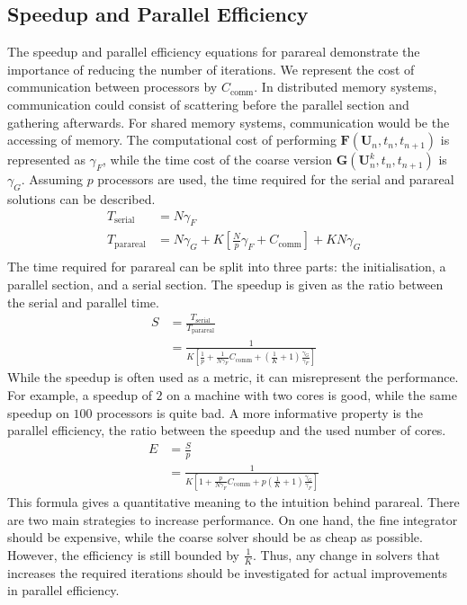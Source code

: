 \subsection{Speedup and Parallel Efficiency}
The speedup and parallel efficiency equations for parareal demonstrate the importance of reducing the number of iterations. We represent the cost of communication between processors by $C_\mathrm{comm}$. In distributed memory systems, communication could consist of scattering before the parallel section and gathering afterwards. For shared memory systems, communication would be the accessing of memory.
The computational cost of performing $\textbf{F}(\textbf{U}_n, t_n, t_{n+1})$ is represented as $\gamma_F$, while the time cost of the coarse version $\textbf{G}(\textbf{U}_n^k, t_n, t_{n+1})$ is $\gamma_G$. Assuming $p$ processors are used, the time required for the serial and parareal solutions can be described.
\begin{equation}
\begin{split}
    T_{\mathrm{serial}} &= N \gamma_F\\
    T_{\mathrm{parareal}} &= N \gamma_G + K\left[\frac{N}{p}\gamma_F + C_\mathrm{comm}\right] + K N \gamma_G\\
\end{split}
\end{equation}
The time required for parareal can be split into three parts: the initialisation, a parallel section, and a serial section. 
The speedup is given as the ratio between the serial and parallel time.
\begin{equation}
\begin{split}
\label{eq: speedup}
    S &= \frac{T_{\mathrm{serial}}}{T_{\mathrm{parareal}}}\\
     &= \frac{1}{K \left[\frac{1}{p} + \frac{1}{N \gamma_F} C_\mathrm{comm} + (\frac{1}{K} + 1)\frac{\gamma_G}{\gamma_F}\right]}
\end{split}
\end{equation}
While the speedup is often used as a metric, it can misrepresent the performance. For example, a speedup of $2$ on a machine with two cores is good, while the same speedup on $100$ processors is quite bad. A more informative property is the parallel efficiency, the ratio between the speedup and the used number of cores. 
\begin{equation}
\begin{split}
\label{eq: parallel efficiency}
   E &= \frac{S}{p}\\
    &= \frac{1}{K\left[1+\frac{p}{N \gamma_F} C_\mathrm{comm} + p(\frac{1}{K} + 1)\frac{\gamma_G}{\gamma_F}\right]}
\end{split}
\end{equation}
This formula gives a quantitative meaning to the intuition behind parareal. There are two main strategies to increase performance. On one hand, the fine integrator should be expensive, while the coarse solver should be as cheap as possible. However, the efficiency is still bounded by $\frac{1}{K}$. Thus, any change in solvers that increases the required iterations should be investigated for actual improvements in parallel efficiency.
